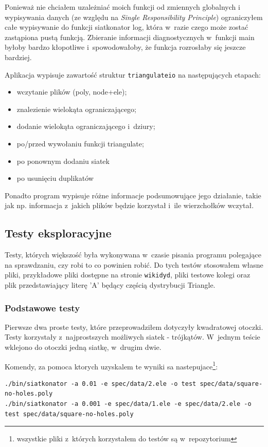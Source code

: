\documentclass[a4paper]{article} \usepackage{setspace}
\begin{document}
Ponieważ nie chciałem uzależniać moich funkcji od zmiennych globalnych i wypisywania danych (ze względu na \emph{Single Responsibility Principle}) ograniczyłem całe wypisywanie do funkcji siatkonator log,
która w~razie czego może zostać zastąpiona pustą funkcją. Zbieranie informacji diagnostycznych w~funkcji main byłoby bardzo kłopotliwe i~spowodowałoby, że funkcja rozrosłaby się jeszcze bardziej.

Aplikacja wypisuje zawartość struktur \texttt{triangulateio} na następujących etapach:
\begin{itemize}
  \item wczytanie plików (poly, node+ele);
  \item znalezienie wielokąta ograniczającego;
  \item dodanie wielokąta ograniczającego i~dziury;
  \item po/przed wywołaniu funkcji triangulate;
  \item po ponownym dodaniu siatek
  \item po usunięciu duplikatów
\end{itemize}

Ponadto program wypisuje różne informacje podsumowujące jego działanie, takie jak np. informacja z~jakich plików będzie korzystał i~ile wierzchołków wczytał.

\subsection{Testy eksploracyjne}
Testy, których większość była wykonywana w~czasie pisania programu polegające na sprawdzaniu, czy robi to co powinien robić.
Do tych testów stosowałem własne pliki, przykładowe pliki dostępne na stronie \texttt{wikidyd}, pliki testowe kolegi oraz plik przedstawiający literę 'A' będący częścią dystrybucji Triangle.

\newpage
\subsubsection{Podstawowe testy}
Pierwsze dwa proste testy, które przeprowadziłem dotyczyły kwadratowej otoczki.
Testy korzystały z~najprostszych możliwych siatek - trójkątów.
W~jednym teście wklejono do otoczki jedną siatkę, w~drugim dwie.

Komendy, za pomoca ktorych uzyskalem te wyniki sa nastepujace\footnote{wszystkie pliki z~których korzystałem do testów są w~repozytorium}:
\begin{lstlisting}
./bin/siatkonator -a 0.01 -e spec/data/2.ele -o test spec/data/square-no-holes.poly
./bin/siatkonator -a 0.001 -e spec/data/1.ele -e spec/data/2.ele -o test spec/data/square-no-holes.poly
\end{lstlisting}
\end{document}
